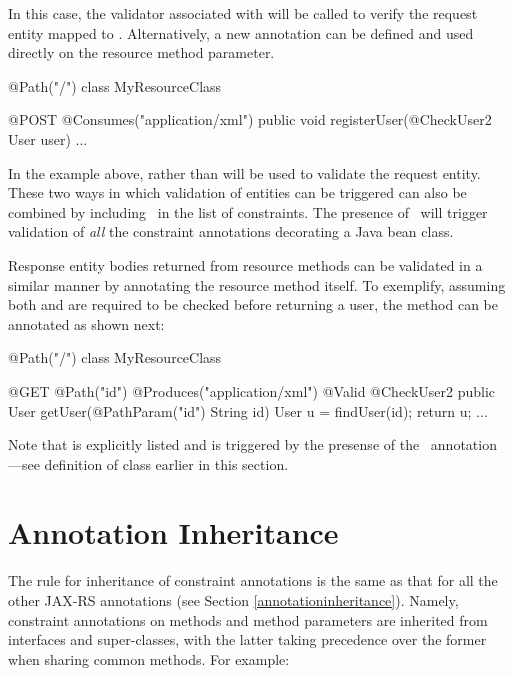 In this case, the validator associated with  will be called to verify the request entity mapped to . Alternatively, a new annotation can be defined and used directly on the resource method parameter. 

\begin{listing}{1}
@Path("/")
class MyResourceClass {

    @POST
    @Consumes("application/xml")
    public void registerUser(@CheckUser2 User user) {
        ...
    }
}
\end{listing}

In the example above,  rather than  will be used to validate the request entity. These two ways in which validation of entities can be triggered can also be combined by including \Valid\ in the list of constraints. The presence of \Valid\ will trigger validation of \emph{all} the constraint annotations decorating a Java bean class.

Response entity bodies returned from resource methods can be validated in a similar manner by annotating the resource method itself. To exemplify, assuming both  and  are required to be checked before returning a user, the  method can be annotated as shown next:

\begin{listing}{1}
@Path("/")
class MyResourceClass {

    @GET
    @Path("{id}")
    @Produces("application/xml")
    @Valid @CheckUser2
    public User getUser(@PathParam("id") String id) {
        User u = findUser(id);
        return u;
    }
    ...
}
\end{listing}

Note that  is explicitly listed and  is triggered by the presense of the \Valid\ annotation ---see definition of  class earlier in this section.

\section{Annotation Inheritance}

The rule for inheritance of constraint annotations is the same as that for all the other JAX-RS annotations (see Section \ref{annotationinheritance}). Namely, constraint annotations on methods and method parameters are inherited from interfaces and super-classes, with the latter taking precedence over the former when sharing common methods. For example:

